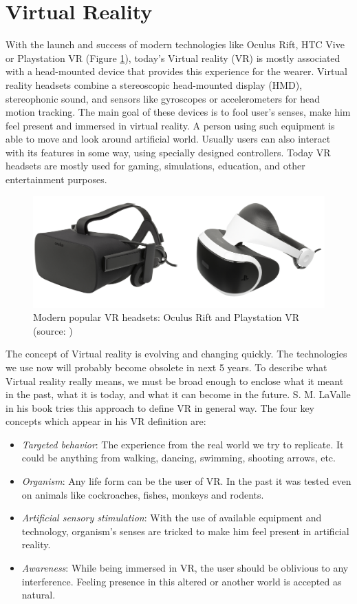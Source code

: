 \section{Virtual Reality}
With the launch and success of modern technologies like Oculus Rift, HTC Vive or Playstation VR (Figure \ref{fig:CONTROLLERS}), today’s Virtual reality (VR) is mostly associated with a head-mounted device that provides this experience for the wearer. Virtual reality headsets combine a stereoscopic head-mounted display (HMD), stereophonic sound, and sensors like gyroscopes or accelerometers for head motion tracking. The main goal of these devices is to fool user’s senses, make him feel present and immersed in virtual reality. A person using such equipment is able to move and look around artificial world. Usually users can also interact with its features in some way, using specially designed controllers. Today VR headsets are mostly used for gaming, simulations, education, and other entertainment purposes.

\begin{figure}[th]
\centering
\includegraphics[width=1\textwidth]{img/headsets.png}
\caption{Modern popular VR headsets: Oculus Rift and Playstation VR (source: \cite{OCULUS_HEADSET}\cite{PSVR_HEADSET})}
\label{fig:CONTROLLERS}
\end{figure}

The concept of Virtual reality is evolving and changing quickly. The technologies we use now will probably become obsolete in next 5 years. To describe what Virtual reality really means, we must be broad enough to enclose what it meant in the past, what it is today, and what it can become in the future. S. M. LaValle in his book \cite{VR_BOOK} tries this approach to define VR in general way. The four key concepts which appear in his VR definition are:

\begin{itemize}
\item \textit{Targeted behavior}: The experience from the real world we try to replicate. It could be anything from walking, dancing, swimming, shooting arrows, etc.
\item \textit{Organism}: Any life form can be the user of VR. In the past it was tested even on animals like cockroaches, fishes, monkeys and rodents.
\item \textit{Artificial sensory stimulation}: With the use of available equipment and technology, organism’s senses are tricked to make him feel present in artificial reality.
\item \textit{Awareness}: While being immersed in VR, the user should be oblivious to any interference. Feeling presence in this altered or another world is accepted as natural.
\end{itemize}

